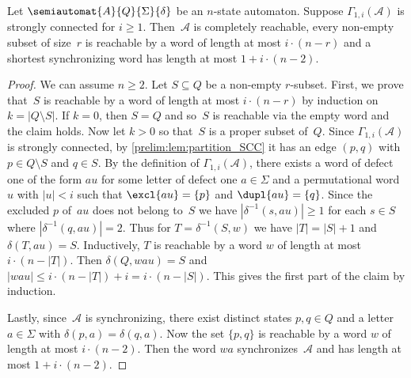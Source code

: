 \begin{theorem} \label{syncmax:thm:Gamma1-SCC-subgraph}
	Let $\semiautomat{A}{Q}{\Sigma}{\delta}$ be an $n$-state automaton.
	Suppose $\Gamma_{1,i}(\mathcal A)$ is strongly connected for $i \ge 1$.
	Then~$\mathcal A$ is completely reachable,
	every non-empty subset of size~$r$ is reachable by a word
	of length at most $i \cdot (n - r)$
	and a shortest synchronizing word has length at most $1 + i \cdot (n - 2)$.
\end{theorem}
\begin{proof}
	We can assume $n \ge 2$.
	Let $S \subseteq Q$ be a non-empty $r$-subset. First, we prove that~$S$ is reachable
	by a word of length at most $i \cdot ( n - r )$
	by induction on $k = |Q \setminus S|$.
	If $k = 0$, then $S = Q$
	and so~$S$ is reachable via the empty word
	and the claim holds.	
	Now let $k > 0$ so that~$S$ is a proper subset of~$Q$.
	Since $\Gamma_{1,i}(\mathcal A)$ is strongly connected,
	by \cref{prelim:lem:partition_SCC}
	it has an edge $(p, q)$ with $p \in Q \setminus S$ and $q \in S$.
	By the definition of $\Gamma_{1,i}(\mathcal A)$,
	there exists a word of defect one of the form $au$
	for some letter of defect one $a \in \Sigma$
	and a permutational word $u$ with $|u| < i$
	such that $\excl{au} = \{ p \}$ and $\dupl{au} = \{ q \}$.
	Since the excluded $p$ of~$au$ does not belong to~$S$
	we have $|\delta^{-1}(s, au)| \ge 1$
	for each $s \in S$
	where $|\delta^{-1}(q, au)| = 2$.
	Thus for $T = \delta^{-1}(S, w)$
	we have $|T| = |S| + 1$ and $\delta(T, au) = S$.
	Inductively, 
	$T$ is reachable by a word $w$ 
	of length at most $i \cdot ( n - |T| )$.
	Then $\delta(Q, wau) = S$
	and $|wau| \le i \cdot ( n - |T| ) + i = i \cdot ( n - |S| )$.
	This gives the first part of the claim by induction.
	
	Lastly, since~$\mathcal A$ is synchronizing,
	there exist distinct states $p, q \in Q$
	and a letter $a \in \Sigma$ with $\delta(p, a) = \delta(q, a)$.
	Now the set $\{p,q\}$ is reachable by a word $w$ of length at most $i \cdot (n - 2)$.
	Then the word $wa$ synchronizes~$\mathcal A$
	and has length at most $1 + i \cdot ( n - 2 )$.
\end{proof}